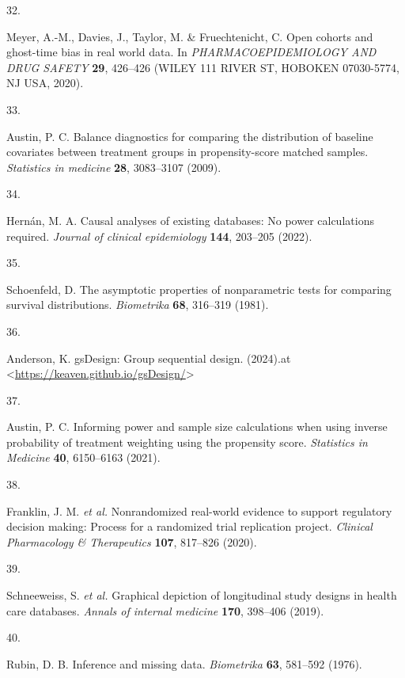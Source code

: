 \documentclass[
  letterpaper,
  DIV=11,
  numbers=noendperiod]{scrartcl}
\newlength{\cslhangindent}
\newlength{\csllabelwidth}
\newenvironment{CSLReferences}[2] %
 {\begin{list}{}{%
  \setlength{\itemindent}{0pt}
  \setlength{\leftmargin}{0pt}
  \setlength{\parsep}{0pt}
  \ifodd #1
   \setlength{\leftmargin}{\cslhangindent}
   \setlength{\itemindent}{-1\cslhangindent}
  \fi
  \setlength{\itemsep}{#2\baselineskip}}}
 {\end{list}}
\newcommand{\CSLLeftMargin}[1]{\parbox[t]{\csllabelwidth}{\strut#1\strut}}
\newcommand{\CSLRightInline}[1]{\parbox[t]{\linewidth - \csllabelwidth}{\strut#1\strut}}
\begin{document}
\begin{CSLReferences}{0}{0}
\CSLLeftMargin{32. }%
\CSLRightInline{Meyer, A.-M., Davies, J., Taylor, M. \& Fruechtenicht,
C. Open cohorts and ghost-time bias in real world data. In
\emph{PHARMACOEPIDEMIOLOGY AND DRUG SAFETY} \textbf{29}, 426--426 (WILEY
111 RIVER ST, HOBOKEN 07030-5774, NJ USA, 2020).}

\CSLLeftMargin{33. }%
\CSLRightInline{Austin, P. C. Balance diagnostics for comparing the
distribution of baseline covariates between treatment groups in
propensity-score matched samples. \emph{Statistics in medicine}
\textbf{28}, 3083--3107 (2009).}

\CSLLeftMargin{34. }%
\CSLRightInline{Hernán, M. A. Causal analyses of existing databases: No
power calculations required. \emph{Journal of clinical epidemiology}
\textbf{144}, 203--205 (2022).}

\CSLLeftMargin{35. }%
\CSLRightInline{Schoenfeld, D. The asymptotic properties of
nonparametric tests for comparing survival distributions.
\emph{Biometrika} \textbf{68}, 316--319 (1981).}

\CSLLeftMargin{36. }%
\CSLRightInline{Anderson, K. gsDesign: Group sequential design.
(2024).at
\textless{}\url{https://keaven.github.io/gsDesign/}\textgreater{}}

\CSLLeftMargin{37. }%
\CSLRightInline{Austin, P. C. Informing power and sample size
calculations when using inverse probability of treatment weighting using
the propensity score. \emph{Statistics in Medicine} \textbf{40},
6150--6163 (2021).}

\CSLLeftMargin{38. }%
\CSLRightInline{Franklin, J. M. \emph{et al.} Nonrandomized real-world
evidence to support regulatory decision making: Process for a randomized
trial replication project. \emph{Clinical Pharmacology \& Therapeutics}
\textbf{107}, 817--826 (2020).}

\CSLLeftMargin{39. }%
\CSLRightInline{Schneeweiss, S. \emph{et al.} Graphical depiction of
longitudinal study designs in health care databases. \emph{Annals of
internal medicine} \textbf{170}, 398--406 (2019).}

\CSLLeftMargin{40. }%
\CSLRightInline{Rubin, D. B. Inference and missing data.
\emph{Biometrika} \textbf{63}, 581--592 (1976).}


\end{CSLReferences}
\end{document}
